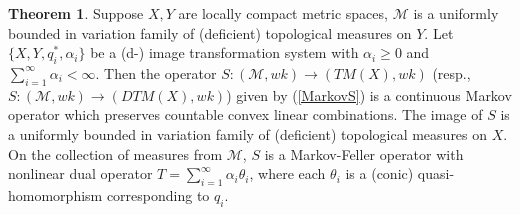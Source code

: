 \documentclass[sn-mathphys-num]{sn-jnl}%
\theoremstyle{thmstyleone}%
\theoremstyle{definition}
\newtheorem{theorem}{Theorem}%
\begin{document}
\begin{theorem} \label{ITcontin}
Suppose $X, Y$ are locally compact metric spaces,   $\mathcal{M}$ is a uniformly bounded in variation family of (deficient) topological measures on $Y$. 
Let $\{ X, Y, q_i^*, \alpha_i \} $ be a (d-) image transformation system with  $\alpha_i \ge 0$ and $\sum_{i=1}^\infty \alpha_i < \infty$.
Then the operator $S: (\mathcal{M}, wk) \longrightarrow (TM(X), wk)$ (resp.,  $S: (\mathcal{M}, wk) \longrightarrow (DTM(X), wk)$) 
given by (\ref{MarkovS}) 
is a continuous Markov operator which preserves countable convex linear combinations. 
The image of $S$ is a uniformly bounded in variation family of (deficient) topological measures on $X$. 
On the collection of measures from $\mathcal{M}$, $S$ is a Markov-Feller operator with nonlinear
dual operator $T = \sum_{i=1}^\infty \alpha_i \theta_i$, where each $\theta_i$ is a (conic) quasi-homomorphism corresponding to $q_i$. 
\end{theorem}
\end{document}
